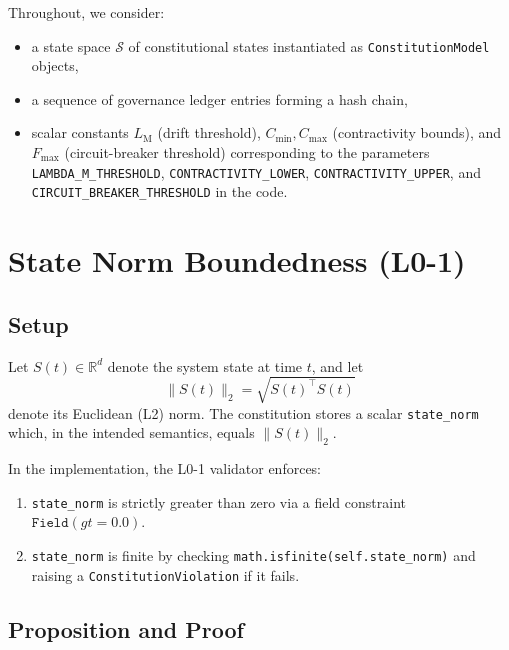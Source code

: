 \documentclass[11pt]{article}
\begin{document}
Throughout, we consider:
\begin{itemize}
  \item a state space \(\mathcal{S}\) of constitutional states instantiated as \texttt{ConstitutionModel} objects,\cite{cite:40}
  \item a sequence of governance ledger entries forming a hash chain,\cite{cite:41}
  \item scalar constants \(L_{\mathrm{M}}\) (drift threshold), \(C_{\min}, C_{\max}\) (contractivity bounds), and \(F_{\max}\) (circuit-breaker threshold) corresponding to the parameters \texttt{LAMBDA\_M\_THRESHOLD}, \texttt{CONTRACTIVITY\_LOWER}, \texttt{CONTRACTIVITY\_UPPER}, and \texttt{CIRCUIT\_BREAKER\_THRESHOLD} in the code.\cite{cite:40}
\end{itemize}

\section{State Norm Boundedness (L0-1)}

\subsection{Setup}

Let \(S(t)\in\mathbb{R}^d\) denote the system state at time \(t\), and let
\[
  \lVert S(t)\rVert_2 = \sqrt{S(t)^\top S(t)}
\]
denote its Euclidean (L2) norm. The constitution stores a scalar \texttt{state\_norm} which, in the intended semantics, equals \(\lVert S(t)\rVert_2\).\cite{cite:40}

In the implementation, the L0-1 validator enforces:
\begin{enumerate}
  \item \texttt{state\_norm} is strictly greater than zero via a field constraint \(\texttt{Field}(gt=0.0)\).\cite{cite:40}
  \item \texttt{state\_norm} is finite by checking \texttt{math.isfinite(self.state\_norm)} and raising a \texttt{ConstitutionViolation} if it fails.\cite{cite:40}
\end{enumerate}

\subsection{Proposition and Proof}
\end{document}
